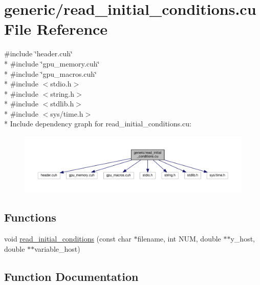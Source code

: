 \hypertarget{read__initial__conditions_8cu}{}\section{generic/read\+\_\+initial\+\_\+conditions.cu File Reference}
\label{read__initial__conditions_8cu}
{\ttfamily \#include \char`\"{}header.\+cuh\char`\"{}}\\*
{\ttfamily \#include \char`\"{}gpu\+\_\+memory.\+cuh\char`\"{}}\\*
{\ttfamily \#include \char`\"{}gpu\+\_\+macros.\+cuh\char`\"{}}\\*
{\ttfamily \#include $<$stdio.\+h$>$}\\*
{\ttfamily \#include $<$string.\+h$>$}\\*
{\ttfamily \#include $<$stdlib.\+h$>$}\\*
{\ttfamily \#include $<$sys/time.\+h$>$}\\*
Include dependency graph for read\+\_\+initial\+\_\+conditions.\+cu\+:\nopagebreak
\begin{figure}[H]
\begin{center}
\leavevmode
\includegraphics[width=350pt]{read__initial__conditions_8cu__incl}
\end{center}
\end{figure}
\subsection*{Functions}
\begin{DoxyCompactItemize}
\item 
void \hyperlink{read__initial__conditions_8cu_a79be377a219a9ab2ae5c3a313b33afed}{read\+\_\+initial\+\_\+conditions} (const char $\ast$filename, int N\+UM, double $\ast$$\ast$y\+\_\+host, double $\ast$$\ast$variable\+\_\+host)
\end{DoxyCompactItemize}


\subsection{Function Documentation}
